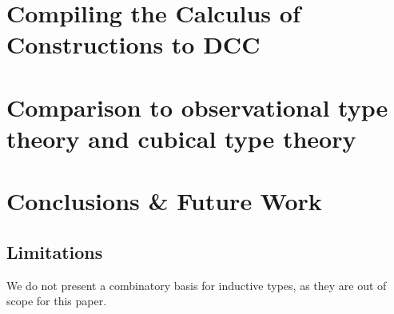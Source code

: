 \documentclass{article}
\begin{document}
\section{Compiling the Calculus of Constructions to DCC}\label{compilelean}

\section{Comparison to observational type theory and cubical type theory}

\section{Conclusions \& Future Work}

\subsection{Limitations}

We do not present a combinatory basis for inductive types, as they are out of scope for this paper.

\end{document}
